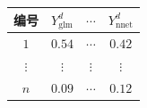\begingroup
\setlength{\tabcolsep}{14pt}
\renewcommand{\arraystretch}{1.20}
\begin{tabular}{|c|c|c|c|}
 \hline
 编号 & $Y^d_{\mathrm{glm}}$ & $\cdots$ & $Y^d_{\mathrm{nnet}}$\\
 \hline
 $1$ & $0.54$ & $\cdots$ & $0.42$\\
 \hline
 \multicolumn{1}{|c}{$\vdots$} & \multicolumn{1}{c}{$\vdots$} & \multicolumn{1}{c}{$\vdots$} & \multicolumn{1}{c|}{$\vdots$}\\
 \hline
 $n$ & $0.09$ & $\cdots$ & $0.12$\\
 \hline
\end{tabular}
\endgroup
